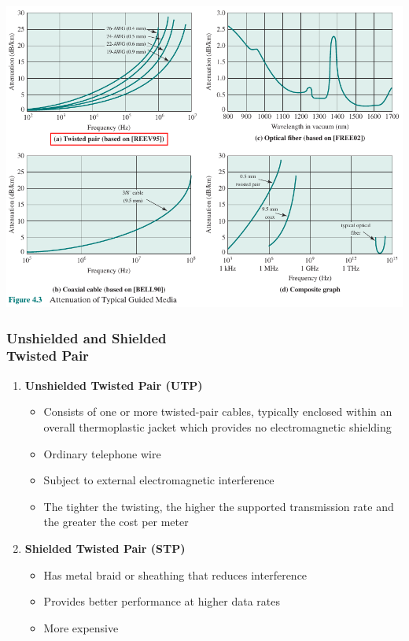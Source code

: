 \documentclass[pdflatex,compress]{beamer}
\begin{document}
\begin{frame}
	\begin{center}
		\includegraphics[width=0.8\linewidth]{img/img06}
	\end{center}
\end{frame}

\begin{frame}
	\frametitle{Unshielded and Shielded\\Twisted Pair}
	\begin{enumerate}
		\item \textbf{Unshielded Twisted Pair (UTP)}
		\begin{itemize}
			\item  Consists of one or more twisted-pair cables, typically enclosed within an overall thermoplastic jacket which provides no electromagnetic shielding
			\item Ordinary telephone wire
			\item Subject to external electromagnetic interference
			\item The tighter the twisting, the higher the supported transmission rate and the greater the cost per meter
		\end{itemize}
		\item \textbf{Shielded Twisted Pair (STP)}
		\begin{itemize}
			\item Has metal braid or sheathing that reduces interference
			\item Provides better performance at higher data rates
			\item More expensive
		\end{itemize}
	\end{enumerate}	
\end{frame}
\end{document}
